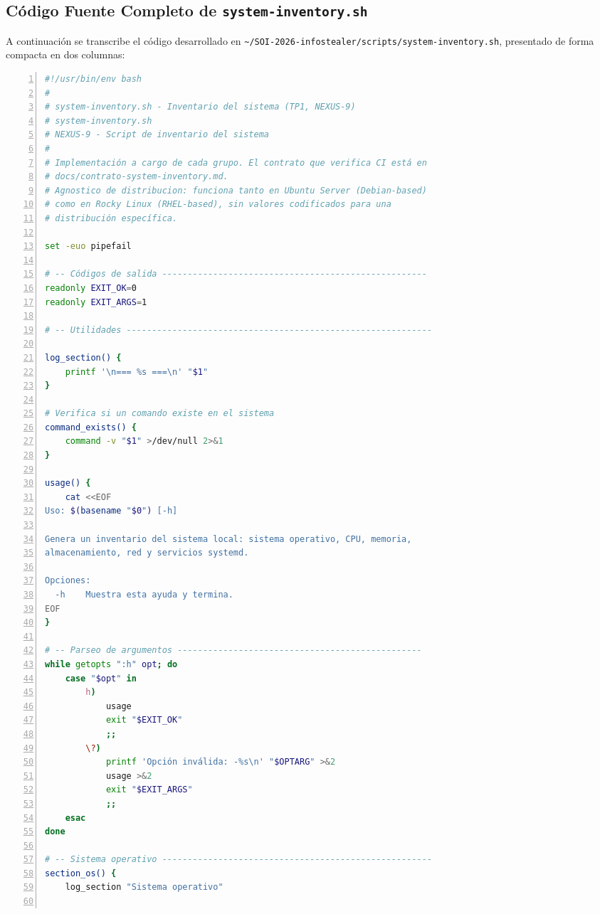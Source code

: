 \documentclass[11pt,a4paper]{article}
\begin{document}
\subsection{Código Fuente Completo de \texttt{system-inventory.sh}}

A continuación se transcribe el código desarrollado en \texttt{\textasciitilde/SOI-2026-infostealer/scripts/system-inventory.sh}, presentado de forma compacta en dos columnas:

\begin{multicols*}{2}
\begin{lstlisting}[language=bash, basicstyle=\fontsize{5.2pt}{6.0pt}\ttfamily\color{darkslate}, numbers=left, numberstyle=\tiny\color{gray!70}, stepnumber=10, xleftmargin=1.0em]
#!/usr/bin/env bash
#
# system-inventory.sh - Inventario del sistema (TP1, NEXUS-9)
# system-inventory.sh
# NEXUS-9 - Script de inventario del sistema
#
# Implementación a cargo de cada grupo. El contrato que verifica CI está en
# docs/contrato-system-inventory.md.
# Agnostico de distribucion: funciona tanto en Ubuntu Server (Debian-based)
# como en Rocky Linux (RHEL-based), sin valores codificados para una
# distribución específica.

set -euo pipefail

# -- Códigos de salida ----------------------------------------------------
readonly EXIT_OK=0
readonly EXIT_ARGS=1

# -- Utilidades ------------------------------------------------------------

log_section() {
    printf '\n=== %s ===\n' "$1"
}

# Verifica si un comando existe en el sistema
command_exists() {
    command -v "$1" >/dev/null 2>&1
}

usage() {
    cat <<EOF
Uso: $(basename "$0") [-h]

Genera un inventario del sistema local: sistema operativo, CPU, memoria,
almacenamiento, red y servicios systemd.

Opciones:
  -h    Muestra esta ayuda y termina.
EOF
}

# -- Parseo de argumentos ------------------------------------------------
while getopts ":h" opt; do
    case "$opt" in
        h)
            usage
            exit "$EXIT_OK"
            ;;
        \?)
            printf 'Opción inválida: -%s\n' "$OPTARG" >&2
            usage >&2
            exit "$EXIT_ARGS"
            ;;
    esac
done

# -- Sistema operativo -----------------------------------------------------
section_os() {
    log_section "Sistema operativo"


\end{lstlisting}
\end{multicols*}
\end{document}
